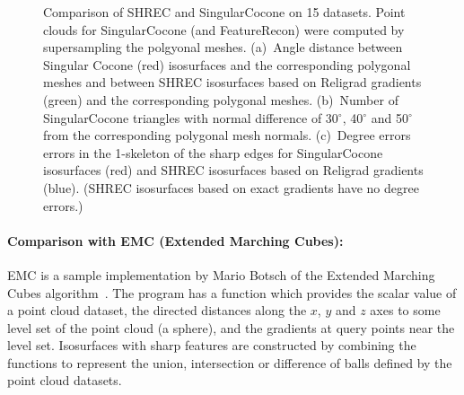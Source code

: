 \begin{figure}[t]
		
\caption{Comparison of SHREC and SingularCocone on 15 datasets.
Point clouds for SingularCocone (and FeatureRecon) were computed
by supersampling the polgyonal meshes.
(a)~Angle distance between Singular Cocone (red) isosurfaces
and the corresponding polygonal meshes
and between SHREC isosurfaces based on Religrad gradients (green)
and the corresponding polygonal meshes.
(b)~Number of SingularCocone triangles 
with normal difference of 30$^\circ$, 40$^\circ$ and 50$^\circ$ 
from the corresponding polygonal mesh normals.
(c)~Degree errors errors in the 1-skeleton of the sharp edges
for SingularCocone isosurfaces (red)
and SHREC isosurfaces based on Religrad gradients (blue).
(SHREC isosurfaces based on exact gradients have no degree errors.)
}
		\label{fig:cocone:compare}
\end{figure}


\paragraph{Comparison with EMC (Extended Marching Cubes):}

EMC is a sample implementation by Mario Botsch
of the Extended Marching Cubes algorithm~\cite{kbsh-fssev-01}.
The program has a function which provides the scalar value of a point cloud dataset,
the directed distances along the $x$, $y$ and $z$ axes to some level set of the point cloud (a sphere),
and the gradients at query points near the level set.
Isosurfaces with sharp features are constructed by combining the functions
to represent the union, intersection or difference of balls 
defined by the point cloud datasets.

